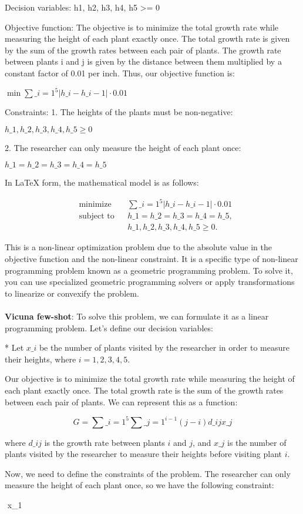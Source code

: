 \documentclass{article}%
\begin{document}
Decision variables:
h1, h2, h3, h4, h5 >= 0

Objective function:
The objective is to minimize the total growth rate while measuring the height of each plant exactly once. The total growth rate is given by the sum of the growth rates between each pair of plants. The growth rate between plants i and j is given by the distance between them multiplied by a constant factor of 0.01 per inch. Thus, our objective function is:

$\min \sum\_{i=1}^{5} |h\_i - h\_{i-1}| \cdot 0.01$

Constraints:
1. The heights of the plants must be non-negative:

$h\_1, h\_2, h\_3, h\_4, h\_5 \geq 0$

2. The researcher can only measure the height of each plant once:

$h\_1 = h\_2 = h\_3 = h\_4 = h\_5$

In LaTeX form, the mathematical model is as follows:

\[
\begin{aligned}
& \text{minimize} && \sum\_{i=1}^{5} |h\_i - h\_{i-1}| \cdot 0.01 \\
& \text{subject to} && h\_1 = h\_2 = h\_3 = h\_4 = h\_5, \\
&&& h\_1, h\_2, h\_3, h\_4, h\_5 \geq 0.
\end{aligned}
\]

This is a non-linear optimization problem due to the absolute value in the objective function and the non-linear constraint. It is a specific type of non-linear programming problem known as a geometric programming problem. To solve it, you can use specialized geometric programming solvers or apply transformations to linearize or convexify the problem.\\\\%
\textbf{Vicuna few-shot}: To solve this problem, we can formulate it as a linear programming problem. Let's define our decision variables:

* Let $x\_i$ be the number of plants visited by the researcher in order to measure their heights, where $i = 1, 2, 3, 4, 5$.

Our objective is to minimize the total growth rate while measuring the height of each plant exactly once. The total growth rate is the sum of the growth rates between each pair of plants. We can represent this as a function:

$$
G = \sum\_{i=1}^{5} \sum\_{j=1}^{i-1} (j-i)d\_ij x\_j
$$

where $d\_ij$ is the growth rate between plants $i$ and $j$, and $x\_j$ is the number of plants visited by the researcher to measure their heights before visiting plant $i$.

Now, we need to define the constraints of the problem. The researcher can only measure the height of each plant once, so we have the following constraint:

$$
x\_1\\\\%
\end{document}
